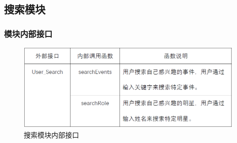 \subsection{搜索模块}
\subsubsection{模块内部接口}
\begin{figure}[!htbp]
	\centering
	\includegraphics[scale=0.7]{image/b4.png} %
	\caption{搜索模块内部接口} %
\end{figure}
